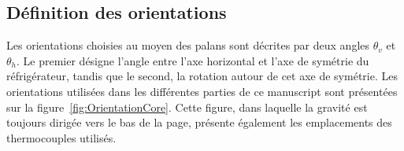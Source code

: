 \subsection{Définition des orientations}

Les orientations choisies au moyen des palans sont décrites par deux angles $\theta_v$ et $\theta_h$. Le premier désigne l'angle entre l'axe horizontal et l'axe de symétrie du réfrigérateur, tandis que le second, la rotation autour de cet axe de symétrie. Les orientations utilisées dans les différentes parties de ce manuscript sont présentées sur la figure~\ref{fig:OrientationCore}. Cette figure, dans laquelle la gravité est toujours dirigée vers le bas de la page, présente également les emplacements des thermocouples utilisés. 

%    

